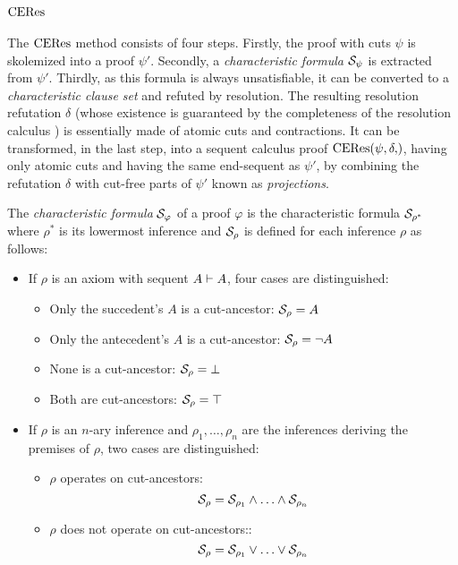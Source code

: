 \documentclass{llncs}
\begin{document}
\section{$\mathrm{CERes}$}
\label{sec:CERes}


The $\mathrm{CERes}$ method consists of four steps. Firstly, the proof with cuts $\psi$ is skolemized into a proof $\psi'$. Secondly, a \emph{characteristic formula} $\mathcal{S}_{\psi}$ is extracted from $\psi'$. Thirdly, as this formula is always unsatisfiable, it can be converted to a \emph{characteristic clause set} and refuted by resolution. The resulting resolution refutation $\delta$ (whose existence is guaranteed by the completeness of the resolution calculus \cite{ToDo}) is essentially made of atomic cuts and contractions. It can be transformed, in the last step, into a sequent calculus proof $\CEResNF{\psi,\delta}$, having only atomic cuts and having the same end-sequent as $\psi'$, by combining the refutation $\delta$ with cut-free parts of $\psi'$ known as \emph{projections}.



\begin{definition}
\label{definition:PertinentStruct}
The \emph{characteristic formula} $\mathcal{S}_{\varphi}$ of a proof $\varphi$ is the characteristic formula $\mathcal{S}_{\rho^*}$ where $\rho^*$ is its lowermost inference and $\mathcal{S}_{\rho}$ is defined for each inference $\rho$ as follows:

\begin{itemize}
	\item If $\rho$ is an axiom with sequent $A \vdash A$, four cases are distinguished:
	\begin{itemize}	 	
	 	\item Only the succedent's $A$ is a cut-ancestor: $\mathcal{S}_{\rho} = A$
	 	\item Only the antecedent's $A$ is a cut-ancestor: $\mathcal{S}_{\rho} = \neg A $
	 	\item None is a cut-ancestor: $\mathcal{S}_{\rho} = \bot $
	 	\item Both are cut-ancestors: $\mathcal{S}_{\rho} = \top$
	\end{itemize}

	\item If $\rho$ is an $n$-ary inference and $\rho_1,\ldots,\rho_n$ are the inferences deriving the premises of $\rho$, two cases are distinguished:
	\begin{itemize}
		\item $\rho$ operates on cut-ancestors:
$$
\mathcal{S}_{\rho} = 
		\mathcal{S}_{\rho_1} \wedge \ldots \wedge \mathcal{S}_{\rho_n}
$$

	\item $\rho$ does not operate on cut-ancestors::
$$
\mathcal{S}_{\rho} = 
		\mathcal{S}_{\rho_1} \vee \ldots \vee \mathcal{S}_{\rho_n}
$$
	\end{itemize}
\end{itemize}
\end{definition}
\end{document}
